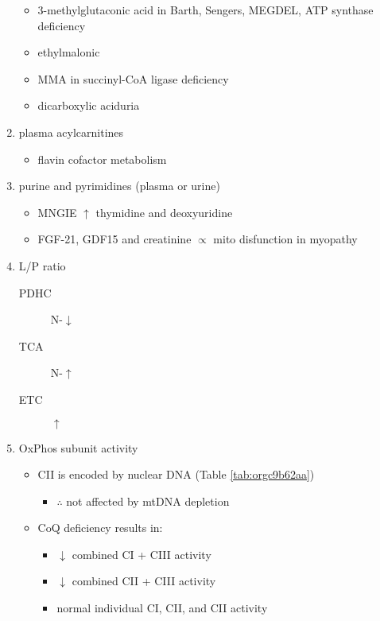 \documentclass[12pt]{scrartcl}
\begin{document}
\begin{enumerate}
\begin{itemize}
\begin{itemize}
\end{itemize}
\item 3-methylglutaconic acid in Barth, Sengers, MEGDEL, ATP synthase deficiency
\item ethylmalonic
\item MMA in succinyl-CoA ligase deficiency
\item dicarboxylic aciduria
\end{itemize}
\item plasma acylcarnitines
\label{sec:orgfc62108}
\begin{itemize}
\item flavin cofactor metabolism
\end{itemize}
\item purine and pyrimidines (plasma or urine)
\label{sec:org2ff0e2d}
\begin{itemize}
\item MNGIE \(\uparrow\) thymidine and deoxyuridine
\end{itemize}
\begin{itemize}
\item FGF-21, GDF15 and creatinine \(\propto\) mito disfunction in myopathy
\end{itemize}

\item L/P ratio
\label{sec:org87b6437}
\begin{description}
\item[{PDHC}] N-\(\downarrow\)
\item[{TCA}] N-\(\uparrow\)
\item[{ETC}] \(\uparrow\)
\end{description}
\item OxPhos subunit activity
\label{sec:org0640c36}
\begin{itemize}
\item CII is encoded by nuclear DNA (Table \ref{tab:orgc9b62aa})
\begin{itemize}
\item \(\therefore\) not affected by mtDNA depletion
\end{itemize}
\item CoQ deficiency results in:
\begin{itemize}
\item \(\downarrow\) combined CI + CIII activity
\item \(\downarrow\) combined CII + CIII activity
\item normal individual CI, CII, and CII activity
\end{itemize}
\end{itemize}
\end{enumerate}
\end{document}
